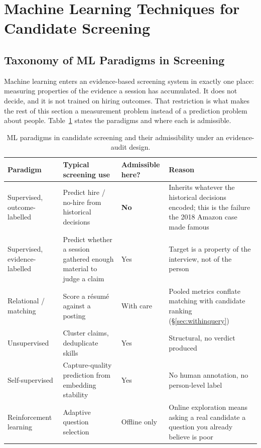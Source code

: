 \section{Machine Learning Techniques for Candidate Screening}
\label{sec:ml}

\subsection{Taxonomy of ML Paradigms in Screening}

Machine learning enters an evidence-based screening system in exactly one place:
measuring properties of the evidence a session has accumulated. It does not
decide, and it is not trained on hiring outcomes. That restriction is what makes the rest of this section a measurement problem instead of a prediction problem about people. Table~\ref{tab:ml-paradigms} states the paradigms and where
each is admissible.

\begin{table}[t]
\caption{ML paradigms in candidate screening and their admissibility under an
evidence-audit design.}
\label{tab:ml-paradigms}
\small
\begin{tabular}{@{}p{2.4cm}p{5.2cm}p{3.2cm}p{4.6cm}@{}}
\toprule
Paradigm & Typical screening use & Admissible here? & Reason \\
\midrule
Supervised, outcome-labelled & Predict hire / no-hire from historical decisions &
\textbf{No} & Inherits whatever the historical decisions encoded; this is the
failure the 2018 Amazon case made famous \\
Supervised, evidence-labelled & Predict whether a session gathered enough
material to judge a claim & Yes & Target is a property of the interview, not of
the person \\
Relational / matching & Score a résumé against a posting & With care & Pooled
metrics conflate matching with candidate ranking (\S\ref{sec:withinquery}) \\
Unsupervised & Cluster claims, deduplicate skills & Yes & Structural, no verdict
produced \\
Self-supervised & Capture-quality prediction from embedding stability & Yes & No
human annotation, no person-level label \\
Reinforcement learning & Adaptive question selection & Offline only & Online
exploration means asking a real candidate a question you already believe is poor \\
\bottomrule
\end{tabular}
\end{table}

